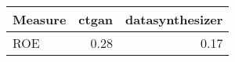 \begin{tabular}{lrr}
  \toprule
Measure & ctgan & datasynthesizer \\ 
  \midrule
ROE & 0.28 & 0.17 \\ 
   \bottomrule
\end{tabular}

